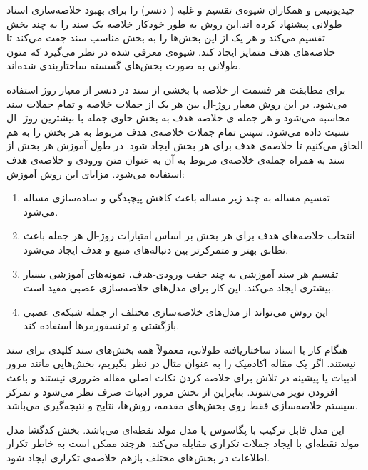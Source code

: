 
جیدیوتیس و همکاران شیوه‌ی تقسیم و غلبه ( دنسر) 
را برای بهبود خلاصه‌سازی اسناد طولانی پیشنهاد کرده اند.این روش به طور خودکار خلاصه یک سند را به چند بخش‌ تقسیم می‌کند و هر یک از این بخش‌ها را به بخش مناسب سند جفت می‌کند تا خلاصه‌های هدف متمایز ایجاد کند. شیوه‌ی معرفی شده در نظر می‌گیرد که متون طولانی به صورت بخش‌های گسسته ساختاربندی شده‌اند. 

برای مطابقت هر قسمت از خلاصه با بخشی از سند در دنسر از معیار روژ 
استفاده ‌می‌شود. در این روش معیار روژ-ال بین هر یک از جملات خلاصه و تمام جملات سند محاسبه می‌شود و هر جمله ی خلاصه هدف به بخش حاوی جمله با بیشترین روژ- ال نسبت داده می‌شود. 
سپس تمام جملات خلاصه‌ی هدف مربوط به هر بخش را به هم الحاق می‌کنیم تا خلاصه‌ی هدف برای هر بخش ایجاد شود. در طول آموزش هر بخش از سند به همراه جمله‌ی خلاصه‌ی مربوط به آن به عنوان متن ورودی و خلاصه‌ی هدف استفاده می‌شود. 
مزایای این روش آموزش:
\begin{enumerate}
	\item {
		تقسیم مساله به چند زیر مساله باعث کاهش پیچیدگی و ساده‌سازی مساله می‌شود.
	}
	\item {
		انتخاب خلاصه‌های هدف برای هر بخش بر اساس امتیازات روژ-ال هر جمله باعث تطابق بهتر و متمرکزتر بین دنباله‌های منبع و هدف ایجاد می‌شود.
	}
	\item {
		تقسیم هر سند آموزشی به چند جفت ورودی-هدف، نمونه‌های آموزشی بسیار بیشتری ایجاد می‌کند. این کار برای مدل‌های خلاصه‌سازی عصبی مفید است. 	
	}
	\item {
		این روش می‌تواند از مدل‌های خلاصه‌سازی مختلف از جمله شبکه‌ی عصبی بازگشتی و ترنسفورمرها استفاده کند.
	}
\end{enumerate}


هنگام کار با اسناد ساختاریافته طولانی، معمولاً همه بخش‌های سند کلیدی برای سند نیستند. اگر یک مقاله آکادمیک را به عنوان مثال در نظر بگیریم، بخش‌هایی مانند مرور ادبیات یا پیشینه در تلاش برای خلاصه کردن نکات اصلی مقاله ضروری نیستند و باعث افزودن نویز می‌شوند. بنابراین از بخش مرور ادبیات صرف نظر می‌شود و تمرکز سیستم خلاصه‌سازی فقط روی بخش‌های مقدمه، روش‌ها، نتایج و نتیجه‌گیری می‌باشد.

این مدل قابل ترکیب با پگاسوس یا مدل مولد نقطه‌ای 
می‌باشد.
بخش کدگشا مدل مولد نقطه‌ای با ایجاد جملات تکراری مقابله ‌می‌کند.
هرچند ممکن است به خاطر تکرار اطلاعات در بخش‌های مختلف بازهم خلاصه‌ی تکراری ایجاد شود.

